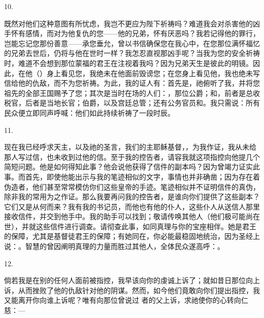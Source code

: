 10. \par

既然对他们这种意图有所忧虑，我岂不更应为陛下祈祷吗？难道我会对杀害他的凶手怀有感情，而对为他复仇的您——他的兄弟，怀有厌恶吗？我若记得他的罪行，岂能忘记您那份善意——承您垂允，曾以书信确保您在我心中，在您那位满怀福忆的兄弟去世后，仍将与他在世时一样？我怎忍直视那凶手呢？当我为您的安全祈祷时，难道不会想到那位蒙福的君王在注视着我吗？因为兄弟天生是彼此的明镜。因此，在他（）身上看见您，我绝未在他面前毁谤您；在您身上看见他，我也绝未写信给他的仇敌，而不为您祈祷。为此，我的证人有：首先是，祂俯听了我，并将您祖先的全部王国赐予了您；其次是当时在场的人们：，那位公爵；和，前者是总收税官，后者是当地长官；伯爵，以及宫廷总管；还有公务官员和。我只需说：所有民众便立即同声呼喊：他们如此持续祈祷了一段时辰。\par

11. \par

现在我已经呼求天主，以及祂的圣言，我们的主耶稣基督，，为我作证，我从未给那人写过信，也未收到过他的信。至于我的控告者，请容我就这项指控向他提几个简短问题。他是如何得知此事？他会说他获得了信件的副本吗？因为曾竭力证实此事。而首先，即使他能出示与我的笔迹相似的文字，事情也并非确凿；因为存在着伪造者，他们甚至常常模仿你们这些皇帝的手迹。笔迹相似并不证明信件的真伪，除非我的常用为之作证。那么我要再问我的控告者，是谁向你们提供了这些副本？它们又是从何而来？我有我的书记员，而他也有他的仆人，这些仆人从送信人那里接收信件，并交到他手中。我的助手可以找到；敬请传唤其他人（他们极可能尚在世），并就这些信件进行调查。请彻查此事，如同真理与你的宝座相伴。她是君王的保障，尤其是基督徒君王的保障；有她同在，你必能最稳固地统治，因为圣经上说：。智慧的曾因阐明真理的力量而胜过其他人，全体民众遂高呼：。\par

12. \par

倘若我是在别的任何人面前被指控，我早该向你的虔诚上诉了；就如昔日那位向上诉，从而挫败了他的仇敌针对他的阴谋。然而，如今他们竟敢向你们提出指控，我又能离开你向谁上诉呢？唯有向那位曾说过  者的父上诉，求祂使你的心转向仁慈：—\par

